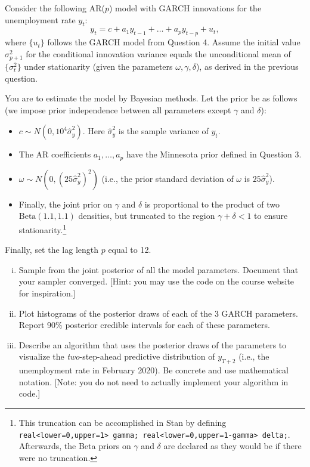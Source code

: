 \documentclass[12pt]{article}
\theoremstyle{plain}
\begin{document}
Consider the following AR($p$) model with GARCH innovations for the unemployment rate $y_t$:
\[y_t = c + a_1 y_{t-1} + \dots + a_p y_{t-p} + u_t,\]
where $\lbrace u_t \rbrace$ follows the GARCH model from Question 4. Assume the initial value $\sigma_{p+1}^2$ for the conditional innovation variance equals the unconditional mean of $\lbrace \sigma_t^2 \rbrace$ under stationarity (given the parameters $\omega,\gamma,\delta$), as derived in the previous question.

You are to estimate the model by Bayesian methods. Let the prior be as follows (we impose prior independence between all parameters except $\gamma$ and $\delta$):
\begin{itemize}
\item $c \sim N\left(0,10^4\hat{\sigma}_y^2\right)$. Here $\hat{\sigma}_y^2$ is the sample variance of $y_t$.
\item The AR coefficients $a_1,\dots,a_p$ have the Minnesota prior defined in Question 3.
\item $\omega \sim N\left(0, (25\hat{\sigma}_y^2)^2\right)$ (i.e., the prior standard deviation of $\omega$ is $25\hat{\sigma}_y^2$).
\item Finally, the joint prior on $\gamma$ and $\delta$ is proportional to the product of two $\text{Beta}(1.1,1.1)$ densities, but truncated to the region $\gamma+\delta<1$ to ensure stationarity.\footnote{This truncation can be accomplished in Stan by defining \texttt{real<lower=0,upper=1> gamma; real<lower=0,upper=1-gamma> delta;}. Afterwards, the Beta priors on $\gamma$ and $\delta$ are declared as they would be if there were no truncation.}
\end{itemize}
Finally, set the lag length $p$ equal to 12.

\begin{enumerate}[i)]
\item Sample from the joint posterior of all the model parameters. Document that your sampler converged. [Hint: you may use the code on the course website for inspiration.]
\item Plot histograms of the posterior draws of each of the 3 GARCH parameters. Report 90\% posterior credible intervals for each of these parameters.
\item Describe an algorithm that uses the posterior draws of the parameters to visualize the \emph{two}-step-ahead predictive distribution of $y_{T+2}$ (i.e., the unemployment rate in February 2020). Be concrete and use mathematical notation. [Note: you do not need to actually implement your algorithm in code.]
\end{enumerate}
\end{document}
